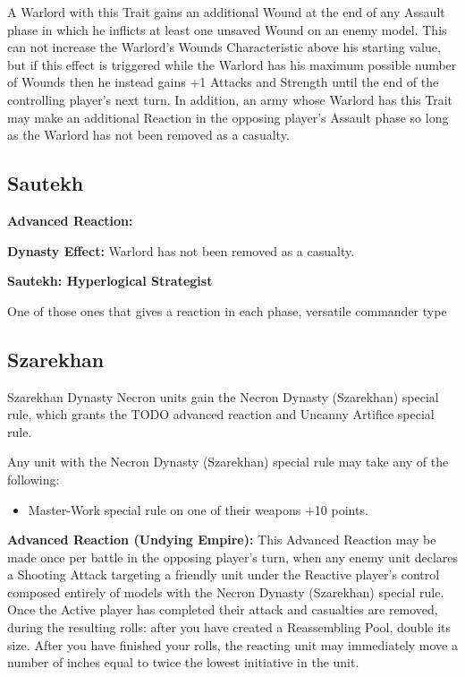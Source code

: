 \begin{multicols}{2}
A Warlord with this Trait gains an additional Wound at the end of any Assault phase in which he inflicts at least one unsaved Wound on an enemy model. This can not increase the Warlord’s Wounds Characteristic above his starting value, but if this effect is triggered while the Warlord has his maximum possible number of Wounds then he instead gains +1 Attacks and Strength until the end of the controlling player’s next turn. In addition, an army whose Warlord has this Trait may make an additional Reaction in the opposing player’s Assault phase so long as the Warlord has not been removed as a casualty.


\newpage
\subsection{Sautekh}

\textbf{Advanced Reaction:}

\textbf{Dynasty Effect:}
Warlord has not been removed as a casualty.

\textbf{Sautekh: Hyperlogical Strategist}

One of those ones that gives a reaction in each phase, versatile commander type


\newpage
\subsection{Szarekhan}

Szarekhan Dynasty Necron units gain the Necron Dynasty (Szarekhan) special rule, which grants the TODO advanced reaction and Uncanny Artifice special rule.

Any unit with the Necron Dynasty (Szarekhan) special rule may take any of the following:
\begin{itemize}
	\item Master-Work special rule on one of their weapons \dotfill +10 points.
\end{itemize}

\textbf{Advanced Reaction (Undying Empire):} This Advanced Reaction may be made once per battle in the opposing player's turn, when any enemy unit declares a Shooting Attack targeting a friendly unit under the Reactive player's control composed entirely of models with the Necron Dynasty (Szarekhan) special rule. Once the Active player has completed their attack and casualties are removed, during the resulting  rolls: after you have created a Reassembling Pool, double its size. After you have finished your  rolls, the reacting unit may immediately move a number of inches equal to twice the lowest initiative in the unit.


\end{multicols}
